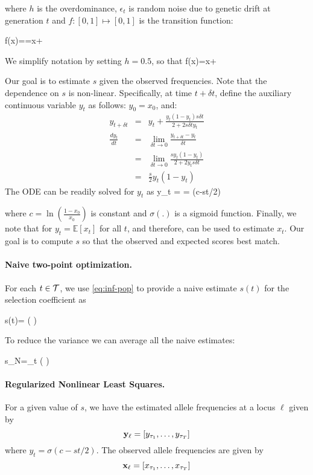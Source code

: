 where $h$ is the overdominance, $\epsilon_t$ is random noise due to
genetic drift at generation $t$ and $f: [0,1] \mapsto [0,1]$ is the
transition function:

\beq
f(x)==x+
\eeq

We simplify notation by setting $h=0.5$, so that
\beq
f(x)=x+
\eeq

Our goal is to estimate $s$ given the observed frequencies. Note that
the dependence on $s$ is non-linear. Specifically, at time $t+\delta
t$, define the auxiliary continuous variable $y_t$ as follows:
$y_0=x_0$, and:
\begin{eqnarray}
  y_{t+\delta t} &=& y_t+\frac{y_t(1-y_t)s\delta t}{2+2s\delta t y_t}\\
  \frac{dy_t}{dt} &=&\lim_{\delta t\rightarrow 0}\frac{y_{t+\delta t} -y_t}{\delta t}\\
   &=&\lim_{\delta t\rightarrow 0}\frac{sy_t(1-y_t)}{2+2y_ts\delta t}\\
   &=& \frac{s}{2}y_t(1-y_t) 
  \label{eq:ode}
\end{eqnarray}
The ODE can be readily solved for $y_t$ as
\beq
y_t = = \sigma(c-st/2) 
\label{eq:inf-pop} 
\eeq

where $c=\ln\left(\frac{1-x_0}{x_0}\right)$ is constant
\cite{multilocus-hitchhike} and $\sigma(.)$ is a sigmoid
function. Finally, we note that for $y_t=\mathbb{E}[x_t]$ for all $t$,
and therefore, can be used to estimate $x_t$. Our goal is to compute
$s$ so that the observed and expected scores best match.

\paragraph{Naive two-point optimization.} 
For each $t\in {\cal T}$, we use \eqref{eq:inf-pop} to provide a naive
estimate $s(t)$ for the selection coefficient as

\beq 
s(t)= \log \left(  \right) 
\eeq

To reduce the variance we can average all the naive estimates: 

\beq
s_{N}=\sum_{t\in \Tc} \log \left(  \right) 
\label{eq:naive}
\eeq


\paragraph{Regularized Nonlinear Least Squares.}
For a given value of $s$, we have the estimated allele frequencies at
a locus $\ell$ given by
\[
{\bf y_{\ell}} = [y_{\tau_1},\ldots,y_{\tau_T}]
\]
where $y_t=\sigma(c-st/2)$. The observed allele frequencies are
given by
\[
{\bf x_{\ell}} = [x_{\tau_1},\ldots,x_{\tau_T}]
\]

